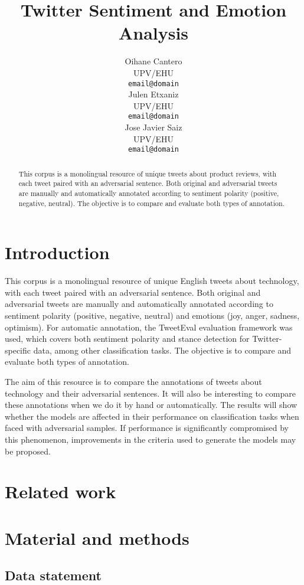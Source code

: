\documentclass[11pt,a4paper]{article}
\title{Twitter Sentiment and Emotion Analysis}
\author{Oihane Cantero \\
  UPV/EHU \\
  \texttt{email@domain} \\\And
  Julen Etxaniz \\
  UPV/EHU \\
  \texttt{email@domain} \\\And
  Jose Javier Saiz \\
  UPV/EHU \\
  \texttt{email@domain} \\}
\date{}
\begin{document}
\maketitle
\begin{abstract}
This corpus is a monolingual resource of unique tweets about product reviews, with each tweet paired with an adversarial sentence. Both original and adversarial tweets are manually and automatically annotated according to sentiment polarity (positive, negative, neutral). The objective is to compare and evaluate both types of annotation.
\end{abstract}

\section{Introduction}

This corpus is a monolingual resource of unique English tweets about technology, with each tweet paired with an adversarial sentence. Both original and adversarial tweets are manually and automatically annotated according to sentiment polarity (positive, negative, neutral) and emotions (joy, anger, sadness, optimism). For automatic annotation, the TweetEval \cite{barbieri-etal-2020-tweeteval} evaluation framework  was used, which covers both sentiment polarity and stance detection for Twitter-specific data, among other classification tasks. The objective is to compare and evaluate both types of annotation.

The aim of this resource is to compare the annotations of tweets about technology and their adversarial sentences. It will also be interesting to compare these annotations when we do it by hand or automatically. The results will show whether the models are affected in their performance on classification tasks when faced with adversarial samples. If performance is significantly compromised by this phenomenon, improvements in the criteria used to generate the models may be proposed.

\section{Related work}

\section{Material and methods}

\subsection{Data statement}
\end{document}
